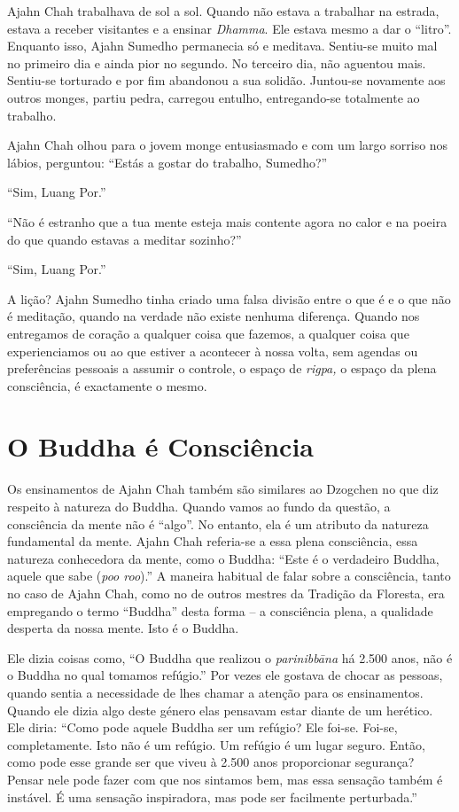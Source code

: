Ajahn Chah trabalhava de sol a sol. Quando não estava a trabalhar na
estrada, estava a receber visitantes e a ensinar \emph{Dhamma}. Ele
estava mesmo a dar o ``litro''. Enquanto isso, Ajahn Sumedho permanecia
só e meditava. Sentiu-se muito mal no primeiro dia e ainda pior no
segundo. No terceiro dia, não aguentou mais. Sentiu-se torturado e por
fim abandonou a sua solidão. Juntou-se novamente aos outros monges,
partiu pedra, carregou entulho, entregando-se totalmente ao trabalho. 

Ajahn Chah olhou para o jovem monge entusiasmado e com um largo sorriso
nos lábios, perguntou: ``Estás a gostar do trabalho, Sumedho?''

``Sim, Luang Por.''

``Não é estranho que a tua mente esteja mais contente agora no calor e
na poeira do que quando estavas a meditar sozinho?''

``Sim, Luang Por.''

A lição? Ajahn Sumedho tinha criado uma falsa divisão entre o que é e o
que não é meditação, quando na verdade não existe nenhuma diferença.
Quando nos entregamos de coração a qualquer coisa que fazemos, a
qualquer coisa que experienciamos ou ao que estiver a acontecer à nossa
volta, sem agendas ou preferências pessoais a assumir o controle, o
espaço de  \emph{rigpa, }o espaço da plena consciência, é exactamente o
mesmo.

\section{O Buddha é Consciência}

Os ensinamentos de Ajahn Chah também são similares ao Dzogchen no que
diz respeito à natureza do Buddha. Quando vamos ao fundo da questão, a
consciência da mente não é ``algo''. No entanto, ela é um atributo da
natureza fundamental da mente. Ajahn Chah referia-se a essa plena
consciência, essa natureza conhecedora da mente, como o Buddha: ``Este é
o verdadeiro Buddha, aquele que sabe (\emph{poo roo}).'' A maneira
habitual de falar sobre a consciência, tanto no caso de Ajahn Chah, como
no de outros mestres da Tradição da Floresta, era empregando o termo
``Buddha'' desta forma -- a consciência plena, a qualidade desperta da
nossa mente. Isto é o Buddha.

Ele dizia coisas como, ``O Buddha que realizou o \emph{parinibbāna} há
2.500 anos, não é o Buddha no qual tomamos refúgio.'' Por vezes ele
gostava de chocar as pessoas, quando sentia a necessidade de lhes chamar
a atenção para os ensinamentos. Quando ele dizia algo deste género elas
pensavam estar diante de um herético. Ele diria: ``Como pode aquele
Buddha ser um refúgio? Ele foi-se. Foi-se, completamente. Isto não é um
refúgio. Um refúgio é um lugar seguro. Então, como pode esse grande ser
que viveu à 2.500 anos proporcionar segurança? Pensar nele pode fazer
com que nos sintamos bem, mas essa sensação também é instável. É uma
sensação inspiradora, mas pode ser facilmente perturbada.''

